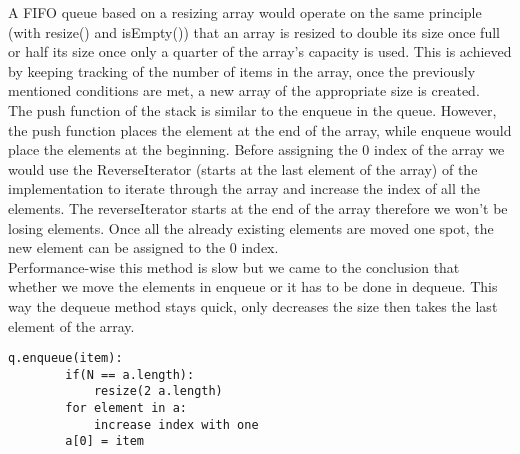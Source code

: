 \documentclass[a4paper]{article}
\begin{document}
\noindent
A FIFO queue based on a resizing array would operate on the same principle (with resize() and isEmpty()) that an array is resized 
to double its size once full or half its size once only a quarter of the array's capacity is used. This is achieved by keeping tracking of 
the number of items in the array, once the previously mentioned conditions are met, a new array 
of the appropriate size is created.
\ \\

\noindent
The push function of the stack is similar to the enqueue in the queue. However, the push function places the element at the end of the array, while enqueue would place the elements at the beginning. Before assigning the 0 index of the array we would use the ReverseIterator (starts at the last element of the array) of the implementation to iterate through the array and increase the index of all the elements. The reverseIterator starts at the end of the array therefore we won't be losing elements. Once all the already existing elements are moved one spot, the new element can be assigned to the 0 index. 
\ \\

\noindent
Performance-wise this method is slow but we came to the conclusion that whether we move the elements in enqueue or it has to be done in dequeue. This way the dequeue method stays quick, only decreases the size then takes the last element of the array. 
\ \\


\begin{lstlisting}[escapeinside={{*}{*}}]
    q.enqueue(item):
    	if(N == a.length):
    		resize(2 a.length)
    	for element in a:
    		increase index with one
    	a[0] = item
    		
\end{lstlisting}
\end{document}
